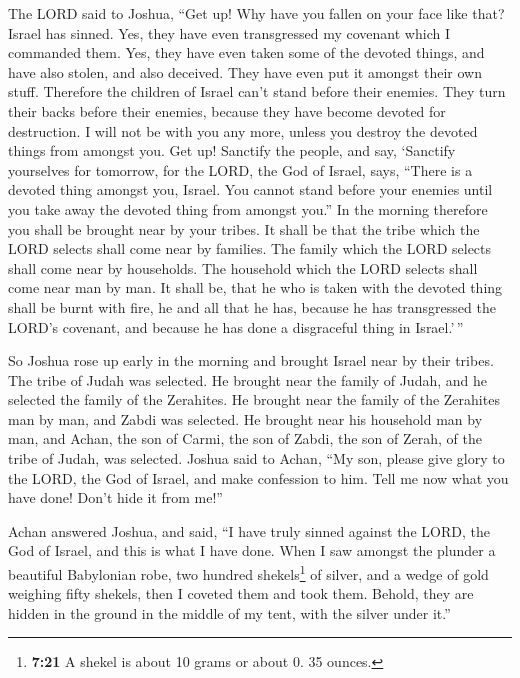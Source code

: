  The LORD said to Joshua, ``Get up! Why have you fallen
on your face like that?  Israel has sinned. Yes, they
have even transgressed my covenant which I commanded them. Yes, they
have even taken some of the devoted things, and have also stolen, and
also deceived. They have even put it amongst their own stuff.
 Therefore the children of Israel can't stand before
their enemies. They turn their backs before their enemies, because they
have become devoted for destruction. I will not be with you any more,
unless you destroy the devoted things from amongst you. 
Get up! Sanctify the people, and say, `Sanctify yourselves for tomorrow,
for the LORD, the God of Israel, says, ``There is a devoted thing
amongst you, Israel. You cannot stand before your enemies until you take
away the devoted thing from amongst you.''  In the
morning therefore you shall be brought near by your tribes. It shall be
that the tribe which the LORD selects shall come near by families. The
family which the LORD selects shall come near by households. The
household which the LORD selects shall come near man by man.
 It shall be, that he who is taken with the devoted thing
shall be burnt with fire, he and all that he has, because he has
transgressed the LORD's covenant, and because he has done a disgraceful
thing in Israel.'\,''

 So Joshua rose up early in the morning and brought
Israel near by their tribes. The tribe of Judah was selected.
 He brought near the family of Judah, and he selected the
family of the Zerahites. He brought near the family of the Zerahites man
by man, and Zabdi was selected.  He brought near his
household man by man, and Achan, the son of Carmi, the son of Zabdi, the
son of Zerah, of the tribe of Judah, was selected. 
Joshua said to Achan, ``My son, please give glory to the LORD, the God
of Israel, and make confession to him. Tell me now what you have done!
Don't hide it from me!''

 Achan answered Joshua, and said, ``I have truly sinned
against the LORD, the God of Israel, and this is what I have done.
 When I saw amongst the plunder a beautiful Babylonian
robe, two hundred shekels\footnote{\textbf{7:21} A shekel is about 10
  grams or about 0. 35 ounces.} of silver, and a wedge of gold weighing
fifty shekels, then I coveted them and took them. Behold, they are
hidden in the ground in the middle of my tent, with the silver under
it.''

